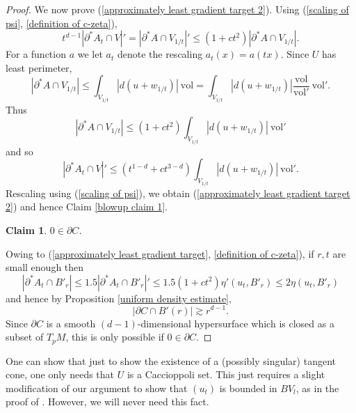 \documentclass[reqno,12pt,letterpaper]{amsart}
\newcommand{\vol}{\mathrm{vol}}
\newtheorem{claim}[theorem]{Claim}
\theoremstyle{definition}
\numberwithin{equation}{section}
\begin{document}
\begin{proof}
We now prove (\ref{approximately least gradient target 2}).
Using (\ref{scaling of psi}, \ref{definition of c-zeta}),
$$t^{d - 1} | \partial^* A_t \cap V|' = |\partial^* A \cap V_{1/t}|' \leq (1 + ct^2) |\partial^* A \cap V_{1/t}|.$$
For a function $a$ we let $a_t$ denote the rescaling $a_t(x) = a(tx)$.
Since $U$ has least perimeter,
$$|\partial^* A \cap V_{1/t}| \leq \int_{V_{1/t}} |d(u + w_{1/t})| ~\vol = \int_{V_{1/t}} |d(u + w_{1/t})| \frac{\vol}{\vol'} ~\vol'.$$
Thus
$$|\partial^* A \cap V_{1/t}| \leq (1 + ct^2) \int_{V_{1/t}} |d(u + w_{1/t})| ~\vol'$$
and so
$$|\partial^* A_t \cap V|' \leq (t^{1 - d} + ct^{3 - d}) \int_{V_{1/t}} |d(u + w_{1/t})| ~\vol'.$$
Rescaling using (\ref{scaling of psi}), we obtain (\ref{approximately least gradient target 2}) and hence Claim \ref{blowup claim 1}.

\begin{claim}
$0 \in \partial C$.
\end{claim}

Owing to (\ref{approximately least gradient target}, \ref{definition of c-zeta}), if $r,t$ are small enough then
$$|\partial^* A_t \cap B'_r| \leq 1.5|\partial^* A_t \cap B'_r|' \leq 1.5(1 + ct^2) \eta'(u_t, B'_r) \leq 2 \eta(u_t, B'_r)$$
and hence by Proposition \ref{uniform density estimate},
$$|\partial C \cap B'(r)| \gtrsim r^{d - 1}.$$
Since $\partial C$ is a smooth $(d-1)$-dimensional hypersurface which is closed as a subset of $T_pM$, this is only possible if $0 \in \partial C$.
\end{proof}

One can show that just to show the existence of a (possibly singular) tangent cone, one only needs that $U$ is a Caccioppoli set.
This just requires a slight modification of our argument to show that $(u_t)$ is bounded in $BV_l$, as in the proof of \cite[Theorem 9.3]{Giusti77}.
However, we will never need this fact.

\end{document}
